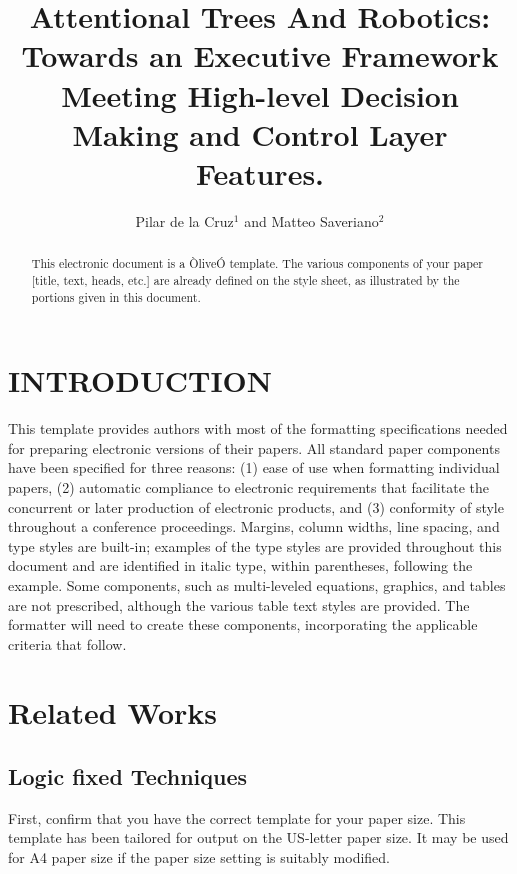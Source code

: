\documentclass[letterpaper, 10 pt, conference]{ieeeconf}  %
\title{\LARGE \bf
Attentional Trees And Robotics: Towards an Executive Framework Meeting High-level Decision Making and Control Layer Features.\\
}
\author{Pilar de la Cruz$^{1}$ and Matteo Saveriano$^{2}$}%
\begin{document}
\maketitle
\thispagestyle{empty}
\pagestyle{empty}


\begin{abstract}

This electronic document is a ÒliveÓ template. The various components of your paper [title, text, heads, etc.] are already defined on the style sheet, as illustrated by the portions given in this document.

\end{abstract}


\section{INTRODUCTION}

This template provides authors with most of the formatting specifications needed for preparing electronic versions of their papers. All standard paper components have been specified for three reasons: (1) ease of use when formatting individual papers, (2) automatic compliance to electronic requirements that facilitate the concurrent or later production of electronic products, and (3) conformity of style throughout a conference proceedings. Margins, column widths, line spacing, and type styles are built-in; examples of the type styles are provided throughout this document and are identified in italic type, within parentheses, following the example. Some components, such as multi-leveled equations, graphics, and tables are not prescribed, although the various table text styles are provided. The formatter will need to create these components, incorporating the applicable criteria that follow.

\section{Related Works}

\subsection{Logic fixed Techniques}

First, confirm that you have the correct template for your paper size. This template has been tailored for output on the US-letter paper size. 
It may be used for A4 paper size if the paper size setting is suitably modified.
\end{document}
